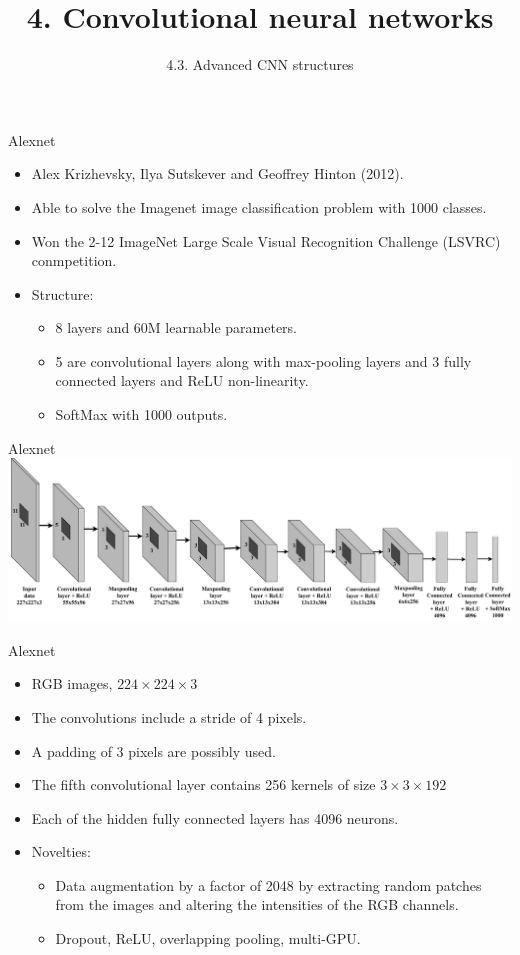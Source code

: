 \documentclass{beamer}
\title{4. Convolutional neural networks}
\subtitle{4.3. Advanced CNN structures}
\begin{document}
\maketitle


\begin{frame}{Alexnet }
\begin{itemize}
    \item Alex Krizhevsky, Ilya Sutskever and Geoffrey Hinton (2012).
    \item Able to solve the Imagenet image classification problem with 1000 classes. 
    \item Won the 2-12 ImageNet Large Scale Visual Recognition Challenge (LSVRC) conmpetition.
    \item Structure:
    \begin{itemize}
     \item 8 layers and 60M learnable parameters. 
     \item  5 are convolutional layers along with max-pooling layers and 3 fully connected layers and ReLU non-linearity. \item SoftMax with 1000 outputs.
     \end{itemize}
\end{itemize}
\end{frame}
\begin{frame}{Alexnet}
    \includegraphics[width=\textwidth]{Module 4 (CNN)/pics/alexnet.pdf}
\end{frame}
\begin{frame}{Alexnet}
\begin{itemize}
    \item RGB images,  $224\times 224 \times 3$ 
    \item The convolutions include a stride of 4 pixels. 
    \item A padding of 3 pixels are possibly used. 
    \item  The fifth convolutional layer contains 256 kernels of size $3\times 3\times 192$ 
    \item Each of the hidden fully connected layers has 4096 neurons. 
    \item Novelties:
    \begin{itemize}
    \item Data augmentation by a factor of 2048 by extracting random patches from the images and altering the intensities of the RGB channels. 
    \item Dropout, ReLU, overlapping pooling, multi-GPU.
    \end{itemize}
\end{itemize}
\end{frame}
\end{document}
